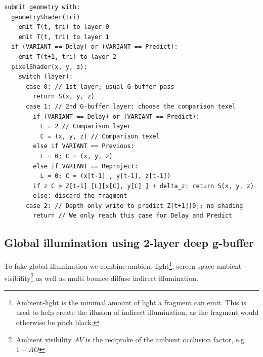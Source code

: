 \documentclass{ACGSeminar}
\begin{document}
		\begin{algorithm} \label{alg:one_pass_strawman} \caption{An improved one-pass algorithm for generating 2-layer deep g-buffers}
		\begin{lstlisting}[frame=single]
submit geometry with:
  geometryShader(tri)
    emit T(t, tri) to layer 0
    emit T(t, tri) to layer 1
  if (VARIANT == Delay) or (VARIANT == Predict):
    emit T(t+1, tri) to layer 2
  pixelShader(x, y, z):
    switch (layer):
      case 0: // 1st layer; usual G-buffer pass
        return S(x, y, z)
      case 1: // 2nd G-buffer layer: choose the comparison texel
        if (VARIANT == Delay) or (VARIANT == Predict):
          L = 2 // Comparison layer
          C = (x, y, z) // Comparison texel
        else if VARIANT == Previous:
          L = 0; C = (x, y, z)
        else if VARIANT == Reproject:
          L = 0; C = (x[t-1] , y[t-1], z[t-1])
        if z C > Z[t-1] [L][x[C], y[C] ] + delta_z: return S(x, y, z)
        else: discard the fragment
      case 2: // Depth only write to predict Z[t+1][0]; no shading
        return // We only reach this case for Delay and Predict
		\end{lstlisting}
		\end{algorithm}
	\subsection{Global illumination using 2-layer deep g-buffer} 
		To fake global illumination we combine ambient-light\footnote{Ambient-light is the minimal amount of light a fragment can emit. This is used to help create the illusion of indirect illumination, as the fragment would otherwise be pitch black.}, screen space ambient visibility\footnote{Ambient visibility $AV$ is the reciproke of the ambient occlusion factor, e.g. $1-AO$} as well as multi bounce diffuse indirect illumination. \cite{RSM} \cite{TSTMT}
\end{document}
